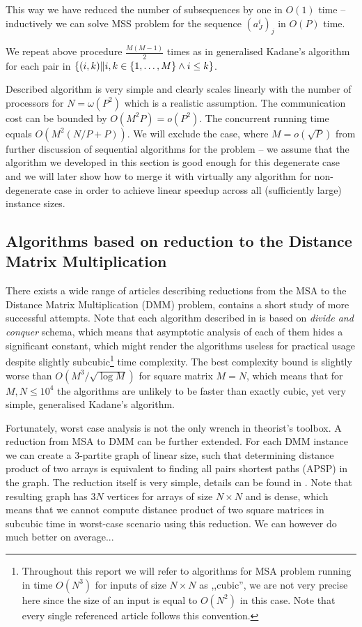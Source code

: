 This way we have reduced the number of subsequences by one in $O(1)$ time -- inductively we can solve MSS problem for the sequence $(a^i_J)_j$ in $O(P)$ time.

We repeat above procedure $\frac{M (M - 1)}{2}$ times as in generalised Kadane's algorithm for each pair in $\{ (i, k) \| i, k \in \{ 1, \dots, M \} \land i \leq k \}$.

Described algorithm is very simple and clearly scales linearly with the number of processors for $N = \omega(P^2)$ which is a realistic assumption.
The communication cost can be bounded by $O(M^2 P) = o(P^2)$.
The concurrent running time equals $O(M^2 (N / P + P))$.
We will exclude the case, where $M = o(\sqrt{P})$ from further discussion of sequential algorithms for the problem -- we assume that the algorithm we developed in this section is good enough for this degenerate case and we will later show how to merge it with virtually any algorithm for non-degenerate case in order to achieve linear speedup across all (sufficiently large) instance sizes.

\subsection*{Algorithms based on reduction to the Distance Matrix Multiplication}

There exists a wide range of articles describing reductions from the MSA to the Distance Matrix Multiplication (DMM) problem, \cite{TakaokaMSA} contains a short study of more successful attempts.
Note that each algorithm described in \cite{TakaokaMSA} is based on \emph{divide and conquer} schema, which means that asymptotic analysis of each of them hides a significant constant, which might render the algorithms useless for practical usage despite slightly subcubic\footnote{Throughout this report we will refer to algorithms for MSA problem running in time $O(N^3)$ for inputs of size $N \times N$ as ,,cubic'', we are not very precise here since the size of an input is equal to $O(N^2)$ in this case. Note that every single referenced article follows this convention.} time complexity.
The best complexity bound is slightly worse than $O(M^3 / \sqrt{\log{M}})$ for square matrix $M = N$, which means that for $M, N \leq 10^4$ the algorithms are unlikely to be faster than exactly cubic, yet very simple, generalised Kadane's algorithm.

Fortunately, worst case analysis is not the only wrench in theorist's toolbox.
A reduction from MSA to DMM can be further extended.
For each DMM instance we can create a $3$-partite graph of linear size, such that determining distance product of two arrays is equivalent to finding all pairs shortest paths (APSP) in the graph.
The reduction itself is very simple, details can be found in \cite{TakaokaMSA}.
Note that resulting graph has $3N$ vertices for arrays of size $N \times N$ and is dense, which means that we cannot compute distance product of two square matrices in subcubic time in worst-case scenario using this reduction.
We can however do much better on average...


